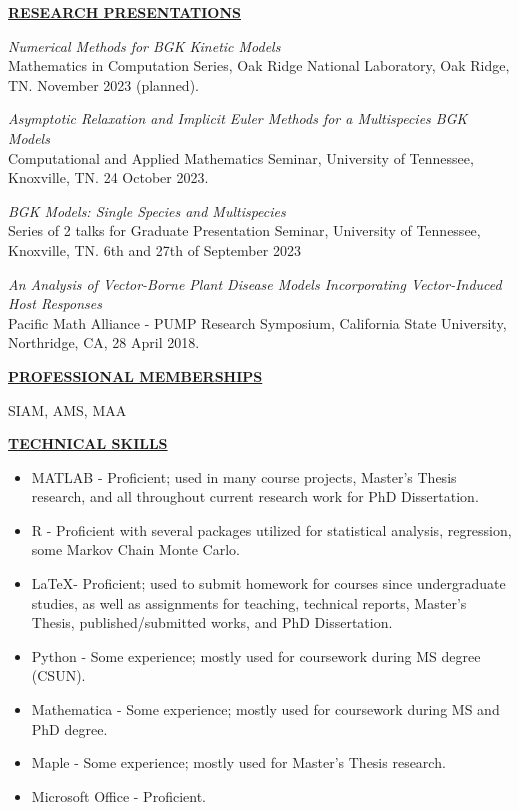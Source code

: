 \documentclass{article}
\begin{document}
\begin{center}
    \textbf{\underline{RESEARCH PRESENTATIONS}}
\end{center}
\begin{etaremune}
    \item \textit{Numerical Methods for BGK Kinetic Models}
    \\
    Mathematics in Computation Series, Oak Ridge National Laboratory, Oak Ridge, TN. November 2023 (planned).
    
    \item \textit{Asymptotic Relaxation and Implicit Euler Methods for a Multispecies BGK Models}
    \\
    Computational and Applied Mathematics Seminar, University of Tennessee, Knoxville, TN. 24 October 2023.

    \item \textit{BGK Models: Single Species and Multispecies}
    \\
    Series of 2 talks for Graduate Presentation Seminar,
    University of Tennessee, Knoxville, TN. 6th and 27th of September 2023
    
    \item \textit{An Analysis of Vector-Borne Plant Disease Models Incorporating Vector-Induced Host Responses}
    \\
    Pacific Math Alliance - PUMP Research Symposium, California State University, Northridge, CA, 28 April 2018.
\end{etaremune}


\begin{center}
    \textbf{\underline{PROFESSIONAL MEMBERSHIPS}}
\end{center}
SIAM, AMS, MAA

\begin{center}
    \textbf{\underline{TECHNICAL SKILLS}}
\end{center}
\begin{itemize}[noitemsep,nolistsep,leftmargin=*]
    \item MATLAB - Proficient; used in many course projects, Master's Thesis research, and all throughout current research work for PhD Dissertation.
    \item R - Proficient with several packages utilized for statistical analysis, regression, some Markov Chain Monte Carlo.
    \item \LaTeX - Proficient; used to submit homework for courses since undergraduate studies, as well as assignments for teaching, technical reports, Master's Thesis, published/submitted works, and PhD Dissertation.
    \item Python - Some experience; mostly used for coursework during MS degree (CSUN).
    \item Mathematica - Some experience; mostly used for coursework during MS and PhD degree.
    \item Maple - Some experience; mostly used for Master's Thesis research.
    \item Microsoft Office - Proficient.
\end{itemize}
\end{document}
